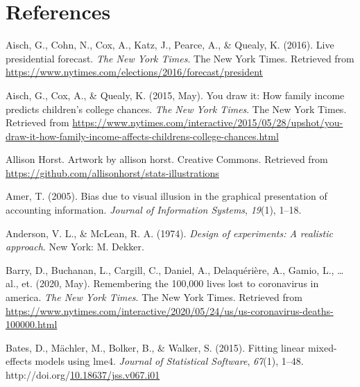 \documentclass[print]{nuthesis}
\newlength{\cslhangindent}
\newenvironment{CSLReferences}[2]%
{\setlength{\parindent}{0pt}%
\everypar{\setlength{\hangindent}{\cslhangindent}}\ignorespaces}%
{\par}
\begin{document}
\backmatter

\hypertarget{references}{%
\chapter*{References}\label{references}}

\noindent

\setlength{\parindent}{-0.20in}
\setlength{\leftskip}{0.20in}
\setlength{\parskip}{8pt}

\hypertarget{refs}{}
\begin{CSLReferences}{1}{0}
\leavevmode{}%
Aisch, G., Cohn, N., Cox, A., Katz, J., Pearce, A., \& Quealy, K. (2016). Live presidential forecast. \emph{The New York Times}. The New York Times. Retrieved from \url{https://www.nytimes.com/elections/2016/forecast/president}

\leavevmode{}%
Aisch, G., Cox, A., \& Quealy, K. (2015, May). You draw it: How family income predicts children's college chances. \emph{The New York Times}. The New York Times. Retrieved from \url{https://www.nytimes.com/interactive/2015/05/28/upshot/you-draw-it-how-family-income-affects-childrens-college-chances.html}

\leavevmode{}%
Allison Horst. Artwork by allison horst. Creative Commons. Retrieved from \url{https://github.com/allisonhorst/stats-illustrations}

\leavevmode{}%
Amer, T. (2005). Bias due to visual illusion in the graphical presentation of accounting information. \emph{Journal of Information Systems}, \emph{19}(1), 1--18.

\leavevmode{}%
Anderson, V. L., \& McLean, R. A. (1974). \emph{Design of experiments: A realistic approach}. New York: M. Dekker.

\leavevmode{}%
Barry, D., Buchanan, L., Cargill, C., Daniel, A., Delaquérière, A., Gamio, L., \ldots{} al., et. (2020, May). Remembering the 100,000 lives lost to coronavirus in america. \emph{The New York Times}. The New York Times. Retrieved from \url{https://www.nytimes.com/interactive/2020/05/24/us/us-coronavirus-deaths-100000.html}

\leavevmode{}%
Bates, D., Mächler, M., Bolker, B., \& Walker, S. (2015). Fitting linear mixed-effects models using {lme4}. \emph{Journal of Statistical Software}, \emph{67}(1), 1--48. http://doi.org/\href{https://doi.org/10.18637/jss.v067.i01}{10.18637/jss.v067.i01}


\end{CSLReferences}
\end{document}
